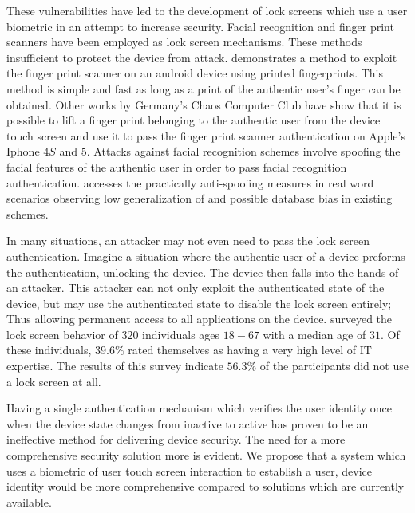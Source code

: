 These vulnerabilities have led to the development of 
lock screens which 
use a user biometric in an attempt to increase security.
Facial recognition and finger print scanners have
been employed as lock screen mechanisms.
These methods insufficient to protect the device from attack.
%
\cite{cao2016hacking} demonstrates a method 
to exploit the finger print scanner on an android device
using printed fingerprints.
This method is simple and fast as long as a print of the
authentic user's finger can be obtained.
%
Other works by Germany's Chaos Computer Club \cite{CHAOS}
have show that it is possible to lift a finger print 
belonging to the authentic user from the device touch screen
and use it to pass the finger print scanner authentication on Apple's Iphone $4S$ and $5$. 
%
Attacks against facial recognition schemes involve
spoofing the facial features of the authentic user
in order to pass facial recognition authentication.
\cite{de2013can}
accesses the practically anti-spoofing measures in real word scenarios
observing 
low generalization of
and possible database bias in existing schemes.

In many situations,
an attacker may not even need to pass the lock screen authentication.
Imagine a situation where the authentic user of a device preforms the authentication,
unlocking the device.
The device then falls into the hands of an attacker.
This attacker can not only exploit the authenticated state of the device,
but may use the authenticated state to disable the lock screen entirely;
Thus allowing permanent access to all applications on the device.
%
\cite{harbach2014sa} surveyed the lock screen behavior of $320$
individuals ages $18 - 67$ with a median age of $31$.
Of these individuals, $39.6\%$  rated themselves as having
a very high level of IT expertise.
The results of this survey indicate $56.3\%$ of the participants
did not use a lock screen at all.


Having a single authentication mechanism which
verifies the user identity once when the device
state changes from inactive to active has
proven to be an ineffective method for 
delivering device security.
%
The need for a more comprehensive security solution more is evident.
%
We propose that a system which uses
a biometric of user touch screen interaction to
establish a user, device identity would 
be more comprehensive compared to solutions 
which are currently available.

